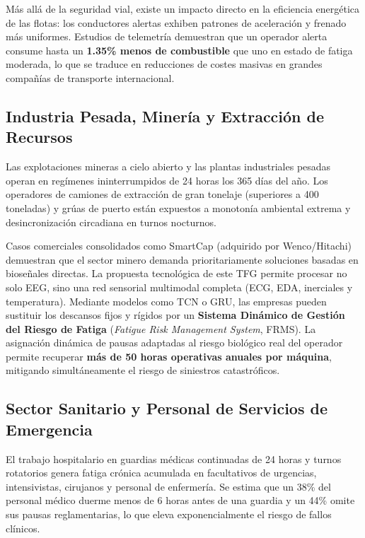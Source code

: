 Más allá de la seguridad vial, existe un impacto directo en la eficiencia energética de las flotas: los conductores alertas exhiben patrones de aceleración y frenado más uniformes. Estudios de telemetría demuestran que un operador alerta consume hasta un \textbf{1.35\% menos de combustible} que uno en estado de fatiga moderada, lo que se traduce en reducciones de costes masivas en grandes compañías de transporte internacional.

\subsection{Industria Pesada, Minería y Extracción de Recursos}

Las explotaciones mineras a cielo abierto y las plantas industriales pesadas operan en regímenes ininterrumpidos de 24 horas los 365 días del año. Los operadores de camiones de extracción de gran tonelaje (superiores a 400 toneladas) y grúas de puerto están expuestos a monotonía ambiental extrema y desincronización circadiana en turnos nocturnos.

Casos comerciales consolidados como SmartCap (adquirido por Wenco/Hitachi) demuestran que el sector minero demanda prioritariamente soluciones basadas en bioseñales directas. La propuesta tecnológica de este TFG permite procesar no solo EEG, sino una red sensorial multimodal completa (ECG, EDA, inerciales y temperatura). Mediante modelos como TCN o GRU, las empresas pueden sustituir los descansos fijos y rígidos por un \textbf{Sistema Dinámico de Gestión del Riesgo de Fatiga} (\textit{Fatigue Risk Management System}, FRMS). La asignación dinámica de pausas adaptadas al riesgo biológico real del operador permite recuperar \textbf{más de 50 horas operativas anuales por máquina}, mitigando simultáneamente el riesgo de siniestros catastróficos.

\subsection{Sector Sanitario y Personal de Servicios de Emergencia}

El trabajo hospitalario en guardias médicas continuadas de 24 horas y turnos rotatorios genera fatiga crónica acumulada en facultativos de urgencias, intensivistas, cirujanos y personal de enfermería. Se estima que un 38\% del personal médico duerme menos de 6 horas antes de una guardia y un 44\% omite sus pausas reglamentarias, lo que eleva exponencialmente el riesgo de fallos clínicos.

